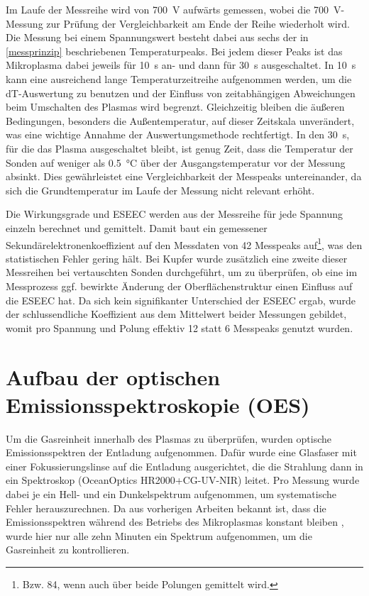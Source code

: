Im Laufe der Messreihe wird von \qty{700}{V} aufwärts gemessen, wobei die \qty{700}{V}-Messung zur Prüfung der Vergleichbarkeit am Ende der Reihe wiederholt wird. 
Die Messung bei einem Spannungswert besteht dabei aus sechs der in \ref{messprinzip} beschriebenen Temperaturpeaks. Bei jedem dieser Peaks ist das Mikroplasma dabei jeweils für \qty{10}{s} an- und dann für \qty{30}{s} ausgeschaltet. In \qty{10}{s} kann eine ausreichend lange Temperaturzeitreihe aufgenommen werden, um die dT-Auswertung zu benutzen und der Einfluss von zeitabhängigen Abweichungen beim Umschalten des Plasmas wird begrenzt. Gleichzeitig bleiben die äußeren Bedingungen, besonders die Außentemperatur, auf dieser Zeitskala unverändert, was eine wichtige Annahme der Auswertungsmethode rechtfertigt. In den \qty{30}{s}, für die das Plasma ausgeschaltet bleibt, ist genug Zeit, dass die Temperatur der Sonden auf weniger als \qty{0,5}{\celsius} über der Ausgangstemperatur vor der Messung absinkt. Dies gewährleistet eine Vergleichbarkeit der Messpeaks untereinander, da sich die Grundtemperatur im Laufe der Messung nicht relevant erhöht.

Die Wirkungsgrade und ESEEC werden aus der Messreihe für jede Spannung einzeln berechnet und gemittelt. Damit baut ein gemessener Sekundärelektronenkoeffizient auf den Messdaten von 42 Messpeaks auf\footnote{Bzw. 84, wenn auch über beide Polungen gemittelt wird.}, was den statistischen Fehler gering hält. Bei Kupfer wurde zusätzlich eine zweite dieser Messreihen bei vertauschten Sonden durchgeführt, um zu überprüfen, ob eine im Messprozess ggf. bewirkte Änderung der Oberflächenstruktur einen Einfluss auf die ESEEC hat. Da sich kein signifikanter Unterschied der ESEEC ergab, wurde der schlussendliche Koeffizient aus dem Mittelwert beider Messungen gebildet, womit pro Spannung und Polung effektiv 12 statt 6 Messpeaks genutzt wurden.

\section{Aufbau der optischen Emissionsspektroskopie (OES)}

Um die Gasreinheit innerhalb des Plasmas zu überprüfen, wurden optische Emissionsspektren der Entladung aufgenommen. Dafür wurde eine Glasfaser mit einer Fokussierungslinse auf die Entladung ausgerichtet, die die Strahlung dann in ein Spektroskop (OceanOptics HR2000+CG-UV-NIR) leitet. Pro Messung wurde dabei je ein Hell- und ein Dunkelspektrum aufgenommen, um systematische Fehler herauszurechnen. Da aus vorherigen Arbeiten bekannt ist, dass die Emissionsspektren während des Betriebs des Mikroplasmas konstant bleiben \cite{hansenConventionalNonconventionalDiagnostics2022}, wurde hier nur alle zehn Minuten ein Spektrum aufgenommen, um die Gasreinheit zu kontrollieren.
